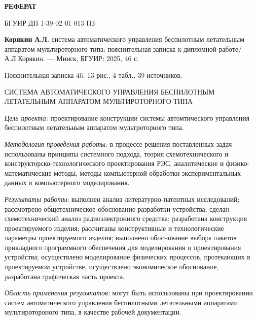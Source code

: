 \thispagestyle{empty} %

\begin{center}  
\textbf{РЕФЕРАТ}
\end{center}

БГУИР ДП 1-39 02 01 013 ПЗ

\textbf{Корякин А.Л.} система автоматического управления
беспилотным летательным аппаратом мультироторного типа:
пояснительная записка к дипломной работе/А.Л.Корякин.
— Минск, БГУИР: 2025, 46 с.

Пояснительная записка 46. 13 рис., 4 табл., 39 источников.

СИСТЕМА АВТОМАТИЧЕСКОГО УПРАВЛЕНИЯ БЕСПИЛОТНЫМ ЛЕТАТЕЛЬНЫМ АППАРАТОМ
МУЛЬТИРОТОРНОГО ТИПА

\textit{Цель проекта:} проектирование конструкции
системы автомтического управления беспилотным летательным аппаратом
мультроторного типа.

\textit{Методология проведения работы:}
в процессе решения поставленных задач использованы принципы системного
подхода, теория схемотехнического и конструкторско-технологического
проектирования РЭС, аналитические и физико-математические методы,
методы компьютерной обработки экспериментальных данных и компьютерного
моделирования.

\textit{Результаты работы:}
выполнен анализ литературно-патентных исследований; рассмотрено
общетехническое обоснование разработки устройства; сделан
схемотехнический анализ радиоэлектронного средства; разработана
конструкция проектируемого изделия; рассчитаны конструктивные и
технологические параметры проектируемого изделия; выполнено
обоснование выбора пакетов прикладного программного обеспечения для
моделирования и проектирования устройства; осуществлено моделирование
физических процессов, протекающих в проектируемом устройстве,
осуществлено экономическое обоснование, разработана графическая часть
проекта.

\textit{Область применения результатов:} могут быть использованы при
проектировании систем автоматического управления беспилотными
летательными аппаратами мультиротороного типа, в качестве рабочей
документации.

\newpage
